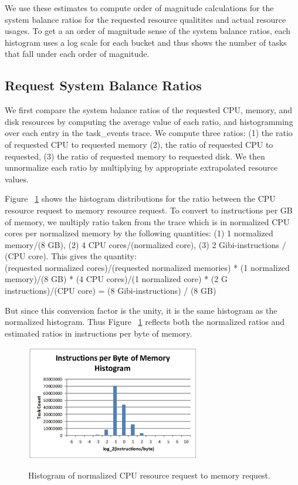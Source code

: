 \documentclass{sig-alternate}
\begin{document}
We use these estimates to compute order of magnitude calculations for the system balance ratios for the requested resource qualitites and actual resource usages.
To get a an order of magnitude sense of the system balance ratios, each histogram uses a log scale for each bucket and thus shows the number of tasks that fall under each order of magnitude.

\subsection{Request System Balance Ratios}

We first compare the system balance ratios of the requested CPU, memory, and disk resources by computing the average value of each ratio, and histogramming over each entry in the task\_events trace.
We compute three ratios: (1) the ratio of requested CPU to requested memory (2), the ratio of requested CPU to requested, (3) the ratio of requested memory to requested disk.
We then unnormalize each ratio by multiplying by appropriate extrapolated resource values.

Figure ~\ref{req_cpu_mem} shows the histogram distributions for the ratio between the CPU resource request to memory resource request. 
To convert to instructions per GB of memory, we multiply ratio taken from the trace which is in normalized CPU cores per normalized memory by the following quantities: (1) 1 normalized memory/(8 GB), (2) 4 CPU cores/(normalized core), (3) 2 Gibi-instructions / (CPU core).  %
This gives the quantity: \\
(requested normalized cores)/(requested normalized memories) * (1 normalized memory)/(8 GB) * (4 CPU cores)/(1 normalized core) * (2 G instructions)/(CPU core) = (8 Gibi-instructions) / (8 GB)

But since this conversion factor is the unity, it is the same histogram as the normalized histogram.
Thus Figure ~\ref{req_cpu_mem} reflects both the normalized ratios and estimated ratios in instructions per byte of memory.

\begin{figure}
\centering
\includegraphics[width=3in]{../figures/req_cpu_mem.jpg}
\label{req_cpu_mem}
\caption{Histogram of normalized CPU resource request to memory request.}
\end{figure}
\end{document}
